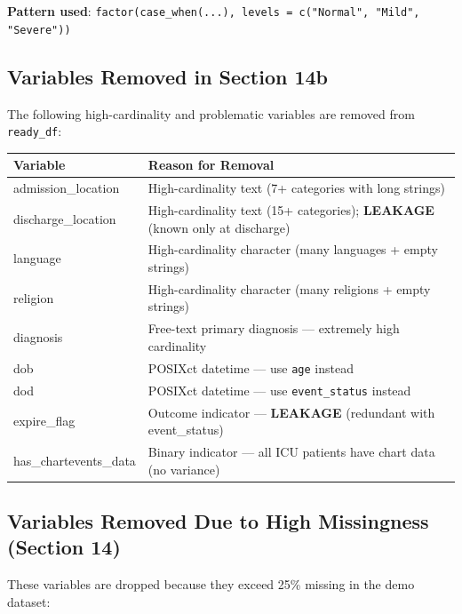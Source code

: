 \documentclass[11pt]{article}
\begin{document}
\textbf{Pattern used}: \texttt{factor(case\_when(...), levels = c("Normal", "Mild", "Severe"))}

\subsection{Variables Removed in Section 14b}

The following high-cardinality and problematic variables are removed from \texttt{ready\_df}:

\begin{longtable}{L{3.5cm}L{10.5cm}}
\toprule
\textbf{Variable} & \textbf{Reason for Removal} \\
\midrule
\endhead
admission\_location & High-cardinality text (7+ categories with long strings) \\
discharge\_location & High-cardinality text (15+ categories); \textbf{LEAKAGE} (known only at discharge) \\
language & High-cardinality character (many languages + empty strings) \\
religion & High-cardinality character (many religions + empty strings) \\
diagnosis & Free-text primary diagnosis --- extremely high cardinality \\
dob & POSIXct datetime --- use \texttt{age} instead \\
dod & POSIXct datetime --- use \texttt{event\_status} instead \\
expire\_flag & Outcome indicator --- \textbf{LEAKAGE} (redundant with event\_status) \\
has\_chartevents\_data & Binary indicator --- all ICU patients have chart data (no variance) \\
\bottomrule
\end{longtable}

\subsection{Variables Removed Due to High Missingness (Section 14)}

These variables are dropped because they exceed 25\% missing in the demo dataset:
\end{document}
